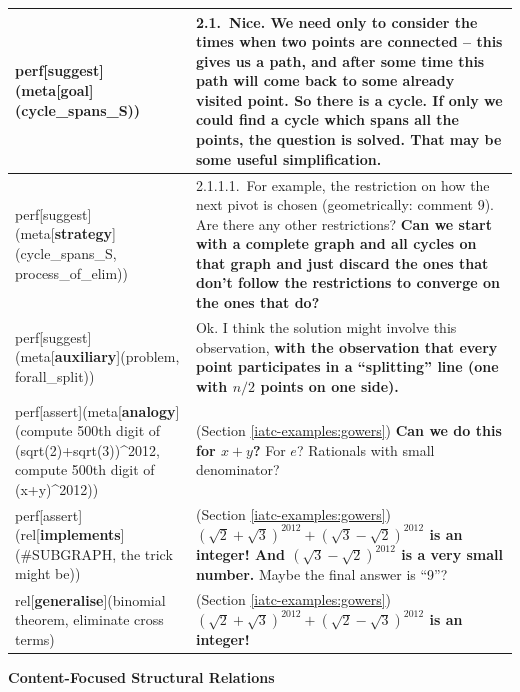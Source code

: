 \documentclass[smallextended,oneside]{svjour3}       %
\begin{document}
{\noindent
\noindent\begin{tabular}{|p{}|p{}|}
\hline
perf[suggest](meta[\textbf{goal}](cycle_spans_S)) & 2.1.~Nice. We need only to consider the times when two points are connected -- this gives us a path, and after some time this path will come back to some already visited point. So there is a cycle. \textbf{If only we could find a cycle which spans all the points, the question is solved}. That may be some useful simplification.\\ \hline
perf[suggest](meta[\textbf{strategy}](cycle_spans_S, process_of_elim)) & 2.1.1.1.~For example, the restriction on how the next pivot is chosen (geometrically: comment 9). Are there any other restrictions? \textbf{Can we start with a complete graph and all cycles on that graph and just discard the ones that don't follow the restrictions to converge on the ones that do?}\\ \hline
perf[suggest](meta[\textbf{auxiliary}](problem, forall_split)) & Ok. I think the solution might involve this observation, \textbf{with the observation that every point participates in a ``splitting'' line (one with $n/2$ points on one side).}\\ \hline
perf[assert](meta[\textbf{analogy}](compute 500th digit of (sqrt(2)+sqrt(3))\textasciicircum2012, compute 500th digit of (x+y)\textasciicircum2012)) & (Section \ref{iatc-examples:gowers}) \textbf{Can we do this for $x+y$?} For $e$?  Rationals with small denominator?\\ \hline
perf[assert](rel[\textbf{implements}](\#SUBGRAPH, the trick might be))  & (Section \ref{iatc-examples:gowers}) \textbf{$(\sqrt{2}+\sqrt{3})^{2012}+(\sqrt{3}-\sqrt{2})^{2012}$ is an integer! And $(\sqrt{3}-\sqrt{2})^{2012}$ is a very small number.} Maybe the final answer is ``9''?\\ \hline
rel[\textbf{generalise}](binomial theorem, eliminate cross terms) & (Section \ref{iatc-examples:gowers}) \textbf{$(\sqrt{2}+\sqrt{3})^{2012} + (\sqrt{2}-\sqrt{3})^{2012}$ is an integer!} \\
\hline
\end{tabular}

\newpage

{\centering
\textbf{Content-Focused Structural Relations}

\par}

\smallskip

}
\end{document}
